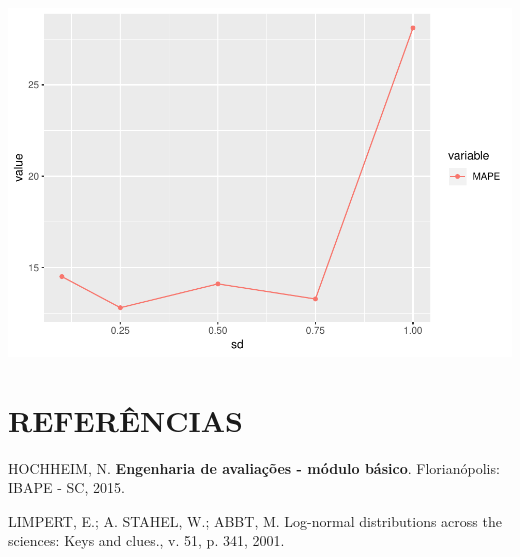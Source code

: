 \documentclass[]{article}
\begin{document}
\includegraphics{Impacto_sigma_files/figure-latex/unnamed-chunk-56-1.pdf}

\section*{REFERÊNCIAS}\label{referencias}

\hypertarget{refs}{}
\hypertarget{ref-hochheim}{}
HOCHHEIM, N. \textbf{Engenharia de avaliações - módulo básico}.
Florianópolis: IBAPE - SC, 2015.

\hypertarget{ref-limpert}{}
LIMPERT, E.; A. STAHEL, W.; ABBT, M. Log-normal distributions across the
sciences: Keys and clues., v. 51, p. 341, 2001.
\end{document}
